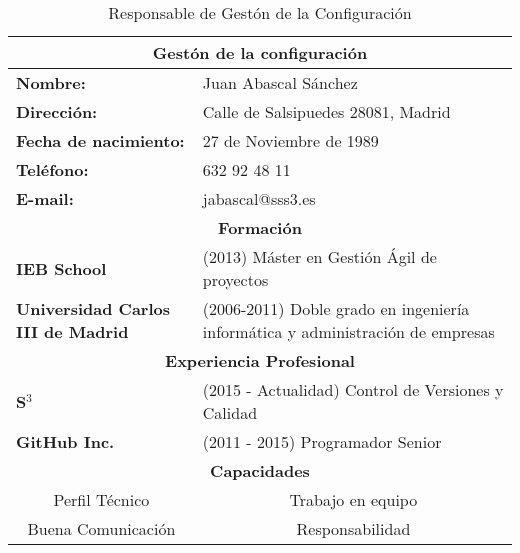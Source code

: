 \begin{table}[!hb]
\begin{center}
\begin{tabular}{p{} p{9cm}}
\multicolumn{2}{c}{\Large{\textbf{Gestón de la configuración}}} \\
\hline
\textbf{Nombre:} & Juan Abascal Sánchez\\
\textbf{Dirección:} &  Calle de Salsipuedes 28081, Madrid\\
\textbf{Fecha de nacimiento:} & 27 de Noviembre de 1989 \\
\textbf{Teléfono:} & 632 92 48 11\\
\textbf{E-mail:} & jabascal@sss3.es\\
\hline \hline
\multicolumn{2}{c}{\textbf{Formación} } \\
\hline
\textbf{IEB School} & (2013) Máster en Gestión Ágil de proyectos\\
\textbf{Universidad Carlos III de Madrid} & (2006-2011) Doble grado en ingeniería informática y administración de empresas\\
\hline \hline
\multicolumn{2}{c}{\textbf{Experiencia Profesional} } \\
\hline
\textbf{S$^3$} & (2015 - Actualidad)  Control de Versiones y Calidad\\
\textbf{GitHub Inc.} & (2011 - 2015) Programador Senior \\
\hline \hline
\multicolumn{2}{c}{\textbf{Capacidades} } \\
\hline
\multicolumn{1}{c}{Perfil Técnico} & \multicolumn{1}{c}{Trabajo en equipo} \\
\multicolumn{1}{c}{Buena Comunicación} & \multicolumn{1}{c}{Responsabilidad} \\
\hline
\end{tabular}
\caption{Responsable de Gestón de la Configuración}
\label{tab:gestConfiguracion}
\end{center}
\end{table}

